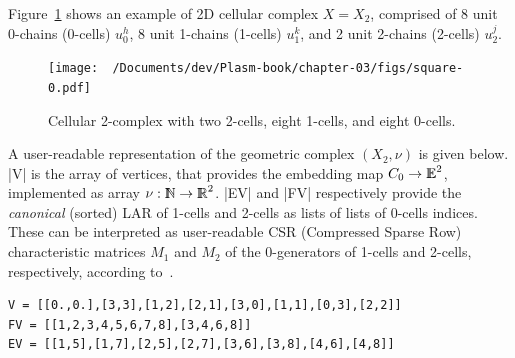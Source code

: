 {\begin{remark}
\begin{end}
\begin{coding}
Figure~\ref{fig:squares} shows an example of 2D cellular complex $X=X_2$, comprised of $8$ unit 0-chains (0-cells) $u_0^h$,  $8$ unit 1-chains (1-cells)  $u_1^k$, and 2 unit 2-chains (2-cells)  $u_2^j$. 
\begin{figure}[htbp] %
   \centering
   \texttt{[image: ~/Documents/dev/Plasm-book/chapter-03/figs/square-0.pdf]} 
   \caption{Cellular 2-complex with two 2-cells, eight 1-cells, and eight 0-cells.}
   \label{fig:squares}
\end{figure}

A user-readable representation of the geometric complex $(X_2,\nu)$ is given below. |V| is the array of vertices, that provides the embedding map $C_0\to\mathbb{I\!\!E}^2$, implemented as array $\nu: \mathbb{I\!\!N}\to\mathbb{I\!\!R}^2$. |EV| and |FV| respectively provide the \emph{canonical} (sorted) LAR  of 1-cells and 2-cells as lists of lists of 0-cells indices. These can be interpreted as user-readable CSR (Compressed Sparse Row) characteristic matrices $M_1$ and $M_2$ of the 0-generators of 1-cells and 2-cells, respectively, according to~\cite{Dicarlo:2014:TNL:2543138.2543294}.

\begin{lstlisting}[language=JuliaLocal, style=julia, mathescape = true]
V = [[0.,0.],[3,3],[1,2],[2,1],[3,0],[1,1],[0,3],[2,2]]
FV = [[1,2,3,4,5,6,7,8],[3,4,6,8]]
EV = [[1,5],[1,7],[2,5],[2,7],[3,6],[3,8],[4,6],[4,8]]
\end{lstlisting}


\end{coding}
\end{end}
\end{remark}}
